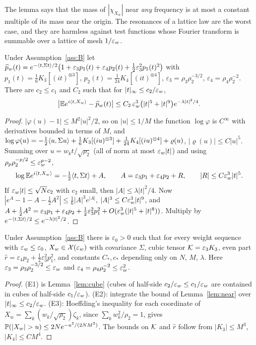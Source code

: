 The lemma says that the mass of $|\chi_{X_w}|$ near \emph{any} frequency is at most a constant multiple of its mass near
the origin. The resonances of a lattice law are the worst case, and they are harmless against test functions whose
Fourier transform is summable over a lattice of mesh $1/\varepsilon_w$.

\begin{lemma}\label{lem:near}
Under Assumption~\ref{ass:B} let
$\widehat{p}_w(t)=e^{-\langle t, \Sigma t\rangle/2}\big(1+\varepsilon_3p_1(t)+\varepsilon_4p_2(t)+\frac12\varepsilon_3^2p_1(t)^2\big)$ with
$p_1(t)=\frac16K_3[(it)^{\otimes3}]$, $p_2(t)=\frac1{24}K_4[(it)^{\otimes4}]$, $\varepsilon_3=\rho_3\rho_2^{-3/2}$,
$\varepsilon_4=\rho_4\rho_2^{-2}$. There are $c_2\le c_1$ and $C_2$ such that for $|t|_\infty\le c_2/\varepsilon_w$,
\[
\big|\mathbb{E} e^{i\langle t, X_w\rangle}-\widehat{p}_w(t)\big|\le C_2\,\varepsilon_w^3\big(|t|^5+|t|^{9}\big)e^{-\lambda|t|^2/4}.
\]
\end{lemma}
\begin{proof}
$|\varphi(u)-1|\le M^2|u|^2/2$, so on $|u|\le1/M$ the function $\log\varphi$ is $C^\infty$ with derivatives bounded in
terms of $M$, and $\log\varphi(u)=-\frac12\langle u, \Sigma u\rangle+\frac16K_3[(iu)^{\otimes3}]+\frac1{24}K_4[(iu)^{\otimes4}]+\varrho(u)$,
$|\varrho(u)|\le C|u|^5$. Summing over $u=w_kt/\sqrt{\rho_2}$ (all of norm at most $\varepsilon_w|t|$) and using
$\rho_p\rho_2^{-p/2}\le\varepsilon_w^{p-2}$,
\[
\log\mathbb{E} e^{i\langle t, X_w\rangle}=-\tfrac12\langle t, \Sigma t\rangle+A,\qquad A=\varepsilon_3p_1+\varepsilon_4p_2+R,\qquad
|R|\le C\varepsilon_w^3|t|^5 .
\]
If $\varepsilon_w|t|\le\sqrt Nc_2$ with $c_2$ small, then $|A|\le\lambda|t|^2/4$. Now $|e^A-1-A-\frac12A^2|\le\frac16|A|^3e^{|A|}$,
$|A|^3\le C\varepsilon_w^3|t|^9$, and
$A+\frac12A^2=\varepsilon_3p_1+\varepsilon_4p_2+\frac12\varepsilon_3^2p_1^2+O(\varepsilon_w^3(|t|^5+|t|^8))$. Multiply by
$e^{-\langle t, \Sigma t\rangle/2}\le e^{-\lambda|t|^2/2}$.
\end{proof}

\begin{proposition}\label{prop:sums}
Under Assumption~\ref{ass:B} there is $\varepsilon_0>0$ such that for every weight sequence with $\varepsilon_w\le\varepsilon_0$,
$X_w\in\mathcal X(\varepsilon_w)$ with covariance $\Sigma$, cubic tensor $\mathcal{K}=\varepsilon_3K_3$, even part
$\widehat r=\varepsilon_4p_2+\frac12\varepsilon_3^2p_1^2$, and constants $C_\ast,c_\ast$ depending only on $N$, $M$,
$\lambda$. Here $\varepsilon_3=\rho_3\rho_2^{-3/2}\le\varepsilon_w$ and $\varepsilon_4=\rho_4\rho_2^{-2}\le\varepsilon_w^2$.
\end{proposition}
\begin{proof}
\textup{(E1)} is Lemma~\ref{lem:cube} (cubes of half-side $c_2/\varepsilon_w\le c_1/\varepsilon_w$ are contained in cubes of half-side
$c_1/\varepsilon_w$). \textup{(E2)}: integrate the bound of Lemma~\ref{lem:near} over $|t|_\infty\le c_2/\varepsilon_w$. \textup{(E3)}:
Hoeffding's inequality for each coordinate of $X_w=\sum_k(w_k/\sqrt{\rho_2})\zeta_k$, since
$\sum_kw_k^2/\rho_2=1$, gives $\Prob(|X_w|>u)\le2Ne^{-u^2/(2NM^2)}$. The bounds on $\mathcal{K}$ and $\widehat r$ follow from
$|K_3|\le M^3$, $|K_4|\le CM^4$.
\end{proof}
